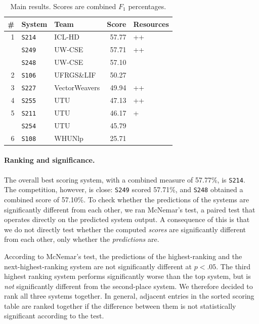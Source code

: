 \documentclass[11pt,letterpaper]{article}
\newcommand{\sys}[1]{\mbox{\texttt{#1}}}   %
\begin{document}
\begin{table}\small\centering
\begin{tabular}{rllrl}
 \#   & \textbf{System} &           \textbf{Team} &  \textbf{Score}  & \textbf{Resources} \\
\midrule
    1 &   \sys{S214} &         ICL-HD &  57.77 &   ++ \\
      &   \sys{S249} &         UW-CSE &  57.71 &   ++ \\
      &   \sys{S248} &         UW-CSE &  57.10 &      \\
    2 &   \sys{S106} &     UFRGS\&LIF &  50.27 &      \\
    3 &   \sys{S227} &  VectorWeavers &  49.94 &   ++ \\
    4 &   \sys{S255} &            UTU &  47.13 &   ++ \\
    5 &   \sys{S211} &            UTU &  46.17 &    + \\
      &   \sys{S254} &            UTU &  45.79 &      \\
    6 &   \sys{S108} &         WHUNlp &  25.71 &      \\
\end{tabular}

\caption{Main results. Scores are combined $F_1$ percentages.}

\label{tbl:main-results}
	
\end{table}


\paragraph{Ranking and significance.}
The overall best scoring system, with a combined measure of 57.77\%, is \sys{S214}. 
The competition, however, is close: \sys{S249} scored 57.71\%, and \sys{S248} obtained a combined score of 57.10\%.  
To check whether the predictions of the systems are significantly different from each other, 
we ran McNemar's test, a paired test that operates directly on the predicted system output. 
A consequence of this is that we do not directly test whether the computed \emph{scores} 
are significantly different from each other, only whether the \emph{predictions} are. 

According to McNemar's test, the predictions of the highest-ranking and the next-highest-ranking system 
are not significantly different at $p < .05$. The third highest ranking system performs significantly worse 
than the top system, but is \emph{not} significantly different from the second-place system. 
We therefore decided to rank all three systems together. 
In general, adjacent entries in the sorted scoring table are ranked together 
if the difference between them is not statistically significant according to the test. 
\end{document}
